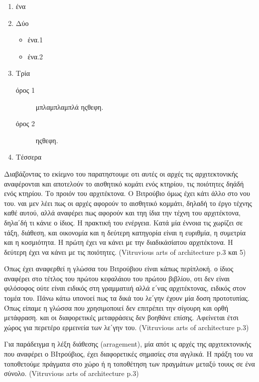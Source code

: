 \begin{enumerate}[noitemsep] %
  \item ένα
  \item Δύο
  
  \begin{itemize}
    \item ένα.1
    \item ένα.2
  \end{itemize}
  
  \item Τρία
  
    \begin{description}
      \item[όρος 1] μπλαμπλαμπλά ηςθεφη.
      \item[όρος 2] ηςθεφη.
    \end{description}
  
  \item Τέσσερα
\end{enumerate}

Διαβάζοντας το εκίεμνο του παρατηστουμε οτι αυτές οι αρχές τις αρχιτεκτονικής 
αναφέρονται και αποτελούν το αισθητικό κομάτι ενός κτηρίου, τις ποιότητες δηάδή 
ενός κτηρίου. Το προιόν του αρχιτέκτονα. Ο Βιτρούβιο όμως έχει κάτι άλλο στο 
νου του. ναι μεν λέει πως οι αρχές αφορούν το αισθητικό κομμάτι, δηλαδή το έργο 
τέχνης καθέ αυτού, αλλά αναφέρει πως αφορούν και τηη ίδια την τέχνη του 
αρχιτέκτονα, δηλα΄δή τι κάνιε ο ίδιος. Η πρακτική του ενέργεια. Κατά μία έννοια 
τις χωρίζει σε τάξη, διάθεση, και οικονομία και η δεύτερη κατηγορία είναι η 
ευριθμία, η συμετρία και η κοσμιότητα. Η πρώτη έχει να κάνει με την 
διαδικάσίατου αρχιτέκτονα. Η δεύτερη έχει να κάνει με τις ποιότητες. 
(Vitruvious arts of architecture p.3 και 5)
  
  Όπως έχει αναφερθεί η γλώσσα του Βιτρούβιου είναι κάπως περίπλοκή. ο ίδιος 
  αναφέρει στο τέτλος του πρώτου κεφαλάιου του πρώτου βιβλίου, οτι δεν είναι 
  φιλόσοφος ούτε είναι ειδικός στη γραμματιιή αλλά ε΄νας αρχιτέκτονας, ειδικός 
  στον τομέα του. Πάνω κάτω υπονοεί πως τα δικά του λε΄γην έχουν μία δοση 
  προτοτυπίας. Όπως είπαμε η γλώσσα που χρησιμοποιεί δεν επιτρέπει την σίγουρη 
  και ορθή μετάφραση. και οι διαφορετικές μεταφράσεις δεν βοηθάνε επίσης. 
  Αφείνεται έτσι χώρος για περετέρο ερμεινεία των λε΄γην του. (Vitruvious arts 
  of architecture p.3)
  
  Για παράδειγμα η λέξη διάθεσης (arragement), μία απότ ις αρχές της αρχιτεκτονικής που αναφέρει ο ΒΙτρούβιος, έχει διαφορετικές σημασίες στα αγγλικά. Η πράξη του να τοποθετούμε πράγματα στο χώρο ή η τοποθέτηση των πραγμάτων μεταξύ τουυς σε ένα σύνολο. (Vitruvious arts of architecture p.3)  
  
